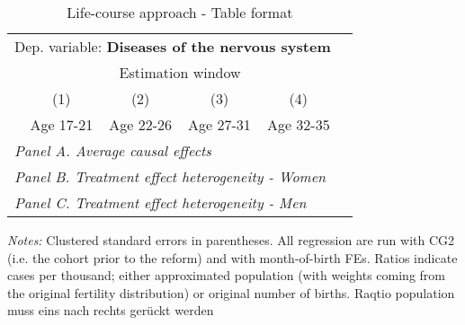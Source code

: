  \begin{table}[H] \centering \begin{threeparttable} \caption{Life-course approach - Table format} {\def\sym#1{\ifmmode^{#1}\else\(^{#1}\)\fi} \begin{tabular}{l*{5}{c}} \toprule \multicolumn{5}{l}{Dep. variable: \textbf{Diseases of the nervous system}} \\ & \multicolumn{4}{c}{Estimation window} \\ \cmidrule(lr){2-5}
            &\multicolumn{1}{c}{(1)}&\multicolumn{1}{c}{(2)}&\multicolumn{1}{c}{(3)}&\multicolumn{1}{c}{(4)}\\
            &\multicolumn{1}{c}{Age 17-21}&\multicolumn{1}{c}{Age 22-26}&\multicolumn{1}{c}{Age 27-31}&\multicolumn{1}{c}{Age 32-35}\\
\midrule
 \multicolumn{5}{l}{\emph{Panel A. Average causal effects}} \\      \midrule\multicolumn{5}{l}{\emph{Panel B. Treatment effect heterogeneity - Women}} \\      \midrule\multicolumn{5}{l}{\emph{Panel C. Treatment effect heterogeneity - Men}} \\      
\bottomrule \end{tabular} } \begin{tablenotes} \item \scriptsize \emph{Notes:} Clustered standard errors in parentheses. All regression are run with CG2 (i.e. the cohort prior to the reform) and with month-of-birth FEs. Ratios indicate cases per thousand; either approximated population (with weights coming from the original fertility distribution) or original number of births. Raqtio population muss eins nach rechts gerückt werden \end{tablenotes} \end{threeparttable} \end{table} 

